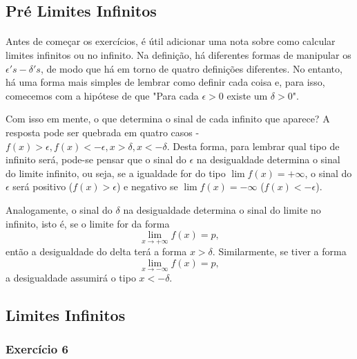 \subsection{Pr\'e Limites Infinitos}
\paragraph{} Antes de come\c car os exerc\'icios, \'e \'util adicionar uma nota sobre como calcular limites infinitos ou no infinito. Na defini\c c\~ao, h\'a diferentes formas de manipular os $\epsilon's-\delta's$, de modo que h\'a em torno de quatro defini\c c\~oes diferentes. No entanto, h\'a uma forma mais simples de lembrar como definir cada coisa e, para isso, comecemos com a hip\'otese de que "Para cada $\epsilon > 0$ existe um $\delta > 0$". 

Com isso em mente, o que determina o sinal de cada infinito que aparece? A resposta pode ser quebrada em quatro casos - $f(x) > \epsilon, f(x) < -\epsilon, x > \delta, x < -\delta$. Desta forma, para lembrar qual tipo de infinito ser\'a, pode-se pensar que o sinal do $\epsilon$ na desigualdade determina o sinal do limite infinito, ou seja, se a igualdade for do tipo $\lim f(x) = +\infty$, o sinal do $\epsilon$ ser\'a positivo ($f(x) > \epsilon$) e negativo se $\lim f(x) = -\infty$ ($f(x) < -\epsilon$). 

Analogamente, o sinal do $\delta$ na desigualdade determina o sinal do limite no infinito, isto \'e, se o limite for da forma 
$$
\lim_{x\to+\infty} f(x) = p,
$$
ent\~ao a desigualdade do delta ter\'a a forma $x > \delta$. Similarmente, se tiver a forma 
$$
\lim_{x\to-\infty} f(x) = p,
$$
a desigualdade assumir\'a o tipo $x < -\delta.$

\subsection{Limites Infinitos}
\subsubsection{Exerc\'icio 6} 
